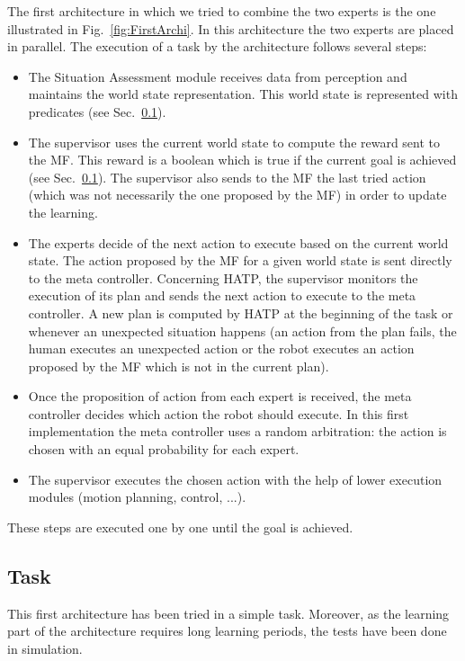 \documentclass[english,a4paper,11pt,twoside]{StyleThese}
\begin{document}
The first architecture in which we tried to combine the two experts is the one illustrated in Fig.~\ref{fig:FirstArchi}. In this architecture the two experts are placed in parallel. The execution of a task by the architecture follows several steps:
\begin{itemize}
\item The Situation Assessment module receives data from perception and maintains the world state representation. This world state is represented with predicates (see Sec.~\ref{subsec:taskOne}).
\item The supervisor uses the current world state to compute the reward sent to the MF. This reward is a boolean which is true if the current goal is achieved (see Sec.~\ref{subsec:taskOne}). The supervisor also sends to the MF the last tried action (which was not necessarily the one proposed by the MF) in order to update the learning.
\item The experts decide of the next action to execute based on the current world state. The action proposed by the MF for a given world state is sent directly to the meta controller. Concerning HATP, the supervisor monitors the execution of its plan and sends the next action to execute to the meta controller. A new plan is computed by HATP at the beginning of the task or whenever an unexpected situation happens (an action from the plan fails, the human executes an unexpected action or the robot executes an action proposed by the MF which is not in the current plan).
\item Once the proposition of action from each expert is received, the meta controller decides which action the robot should execute. In this first implementation the meta controller uses a random arbitration: the action is chosen with an equal probability for each expert.
\item The supervisor executes the chosen action with the help of lower execution modules (motion planning, control, ...). 
\end{itemize}
These steps are executed one by one until the goal is achieved.



\subsection{Task}

\label{subsec:taskOne}

This first architecture has been tried in a simple task. Moreover, as the learning part of the architecture requires long learning periods, the tests have been done in simulation.
\end{document}
